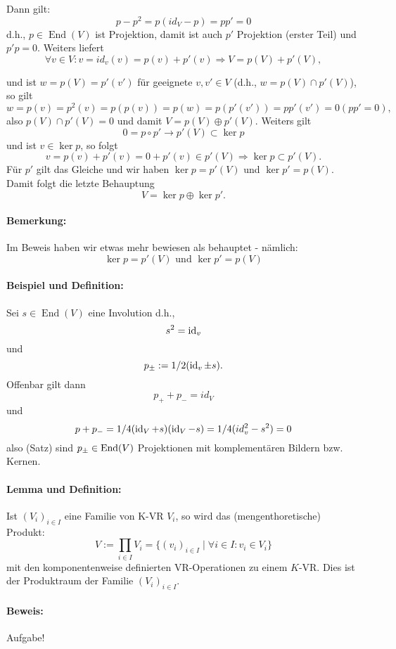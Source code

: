 	Dann gilt:
		\[p-p^2 = p(id_V-p) = pp' = 0\]
	d.h., $p\in\operatorname{End}(V)$ ist Projektion, damit ist auch $p'$ Projektion (erster Teil) und $p' p = 0 $. Weiters liefert
		\[\forall v\in V: v=id_v(v) = p(v) + p'(v) \Rightarrow V = p(V)+p'(V),\]

	und ist $w = p(V)= p'(v')$ für geeignete $v,v'\in V$ (d.h., $w  = p(V)\cap p'(V)$), so gilt
		\[ w = p(v) = p^2(v) = p(p(v)) = p(w) = p(p'(v')) = pp'(v') = 0 (pp' = 0), \]
	also $p(V)\cap p'(V) = {0}$ und damit $V = p(V)\oplus p'(V)$. Weiters gilt
		\[0 = p \circ p' \rightarrow p'(V)\subset \ker p\]
	und ist $v\in \ker p$, so folgt
		\[v = p(v) + p'(v) = 0 + p'(v)\in p'(V) \Rightarrow \ker p \subset p'(V).\]
	Für $p'$ gilt das Gleiche und wir haben $\ker p = p'(V)$ und $\ker p' = p(V)$.
	Damit folgt die letzte Behauptung 
		\[V = \ker p \oplus\ker p'.\]
	
\paragraph{Bemerkung: }
		Im Beweis haben wir etwas mehr bewiesen als behauptet - nämlich:
			\[ \ker p = p'(V)\text{ und }\ker p' = p(V) \]
		
\paragraph{Beispiel und Definition: }	
		Sei $s\in \operatorname{End}(V)$ eine Involution d.h., 
			\[ s^2 = \operatorname{id}_v \] 
		und 
			\[ p_\pm := 1/2(\operatorname{id}_v\pm s). \]
		Offenbar gilt dann
			\[ p_{+} + p_{-} = id_V \] 
		und 
			\[ p + p_{-} = 1/4(\operatorname{id}_V +s)(\operatorname{id}_V -s) = 1/4(id_v^2-s^2)=0 \]
		also (Satz) sind $p_\pm\in\operatorname{End}(V)$ Projektionen mit komplementären Bildern bzw. Kernen.
		
\paragraph{Lemma und Definition: }
		Ist $(V_i)_{i\in I}$ eine Familie von K-VR $V_i$, so wird das (mengenthoretische) Produkt:
			\[V:= \prod_{i\in I}V_i=\{(v_i)_{i\in I}\mid\forall i\in I:v_i\in V_i\}\]
		mit den komponentenweise definierten VR-Operationen zu einem $ K $-VR. Dies ist der Produktraum der Familie	$(V_i)_{i\in I}$.
		
\paragraph{Beweis: } Aufgabe!

